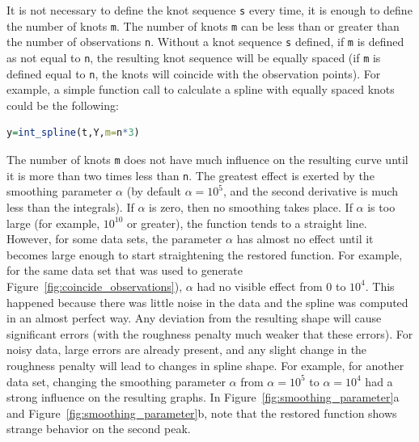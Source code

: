 \documentclass[a4paper,10pt]{article}
\begin{document}
It is not necessary to define the knot sequence \lstinline|s| every time, it is enough to define the number of knots \lstinline|m|.
The number of knots \lstinline|m| can be less than or greater than the number of observations \lstinline|n|.
Without a knot sequence \lstinline|s| defined, if \lstinline|m| is defined as not equal to \lstinline|n|, the resulting knot sequence will be equally spaced (if \lstinline|m| is defined equal to \lstinline|n|, the knots will coincide with the observation points).
For example, a simple function call to calculate a spline with equally spaced knots could be the following:
\begin{lstlisting}[language=R]
	y=int_spline(t,Y,m=n*3)	
\end{lstlisting}
The number of knots \lstinline|m| does not have much influence on the resulting curve until it is more than two times less than \lstinline|n|.
The greatest effect is exerted by the smoothing parameter $\alpha$ (by default $\alpha=10^5$, and the second derivative is much less than the integrals).
If $\alpha$ is zero, then no smoothing takes place.
If $\alpha$ is too large (for example, $10^{10}$ or greater), the function tends to a straight line. 
However, for some data sets, the parameter $\alpha$ has almost no effect until it becomes large enough to start straightening the restored function.
For example, for the same data set that was used to generate Figure~\ref{fig:coincide_observations}), $\alpha$ had no visible effect from 0 to $10^4$.
This happened because there was little noise in the data and the spline was computed in an almost perfect way.
Any deviation from the resulting shape will cause significant errors (with the roughness penalty much weaker that these errors).
For noisy data, large errors are already present, and any slight change in the roughness penalty will lead to changes in spline shape.
For example, for another data set, changing the smoothing parameter $\alpha$ from $\alpha=10^5$ to $\alpha=10^4$ had a strong influence on the resulting graphs.
In Figure~\ref{fig:smoothing_parameter}a and Figure~\ref{fig:smoothing_parameter}b, note that the restored function shows strange behavior on the second peak.
\end{document}
